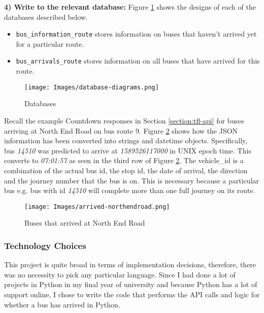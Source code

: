 \textbf{4) Write to the relevant database:} Figure \ref{fig:databases} shows the designs of each of the databases described below.

\begin{itemize}
    \item \texttt{bus\_information\_route} stores information on buses that haven't arrived yet for a particular route.
    \item \texttt{bus\_arrivals\_route} stores information on all buses that have arrived for this route. 
\end{itemize}

\begin{figure}[H]
\begin{center}
    \texttt{[image: Images/database-diagrams.png]}
    \caption{Databases}
    \label{fig:databases}
\end{center}
\end{figure}

Recall the example Countdown responses in Section \ref{section:tfl-api} for buses arriving at North End Road on bus route 9. Figure \ref{fig:arrived-database} shows how the JSON information has been converted into strings and datetime objects. Specifically, bus \textit{14510} was predicted to arrive at \textit{1589526117000} in UNIX epoch time. This converts to \textit{07:01:57} as seen in the third row of Figure \ref{fig:arrived-database}. The vehicle\_id is a combination of the actual bus id, the stop id, the date of arrival, the direction and the journey number that the bus is on. This is necessary because a particular bus e.g. bus with id \textit{14510} will complete more than one full journey on its route. \\

\begin{figure}[H]
\begin{center}
    \texttt{[image: Images/arrived-northendroad.png]}
    \caption{Buses that arrived at North End Road}
    \label{fig:arrived-database}
\end{center}
\end{figure}

\subsubsection{Technology Choices}

This project is quite broad in terms of implementation decisions, therefore, there was no necessity to pick any particular language. Since I had done a lot of projects in Python in my final year of university and because Python has a lot of support online, I chose to write the code that performs the API calls and logic for whether a bus has arrived in Python. \\

